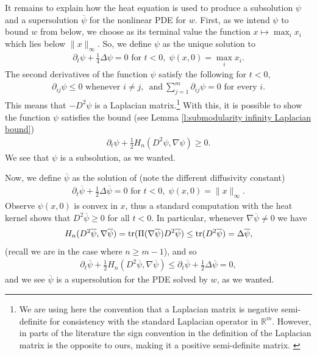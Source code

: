 \documentclass[reqno]{amsart}
\numberwithin{equation}{section}
\DeclareMathOperator{\tr}{\mathrm\mathrm{tr}}
\begin{document}
It remains to explain how the heat equation is used to produce a subsolution $\psi$ and a supersolution $\overline \psi$ for the nonlinear PDE for $w$. First, as we intend $\psi$ to bound $w$ from below, we choose as its terminal value the function  $x\mapsto \max_i x_i$ which lies below $\|x\|_\infty$.  So, we define $\psi$ as the unique solution to
\begin{align*}
  \partial_t \psi + \tfrac{1}{4} \Delta \psi = 0 \text{ for } t<0, \;\psi(x,0) = \max_i x_i.
\end{align*}
The second derivatives of the function $\psi$ satisfy the following for $t<0$,
\begin{align*}
 \partial_{ij}\psi \leq 0 \text{ whenever } i\neq j,\;  ~\text{and}~\sum_{j=1}^m \partial_{ij}\psi = 0 \text{ for every } i.    
\end{align*}
This means that $-D^2\psi$ is a Laplacian  matrix.\footnote{We are using here the convention that a Laplacian matrix is negative semi-definite for consistency with the standard Laplacian operator in $\mathbb{R}^m$. However, in parts of the literature the sign convention in the definition of the Laplacian matrix is the opposite to ours, making it a positive semi-definite matrix. \label{fn:laplacian}} With this, it is possible to show the function $\psi$ satisfies the bound (see Lemma \ref{l:submodularity infinity Laplacian bound})
\begin{align*}
  \partial_t \psi + \tfrac{1}{2}H_n(D^2\psi,\nabla \psi) \geq 0.
\end{align*}
We see that $\psi$ is a subsolution, as we wanted.

Now, we define $\overline \psi$ as the solution of (note the different diffusivity constant)
\begin{align*}
  \partial_t \overline \psi + \tfrac{1}{2}\Delta \overline \psi = 0\text{ for } t<0,\; \psi(x,0) = \|x\|_\infty.    
\end{align*}
Observe $\psi(x,0)$ is convex in $x$, thus a standard computation with the heat kernel shows that $D^2\overline \psi \geq 0$ for all $t<0$. In particular, whenever $\nabla \overline \psi \neq 0$ we have 
\begin{align*}
  H_n(D^2\overline \psi,\nabla \overline \psi) = \tr(\Pi(\nabla \overline \psi)D^2\overline \psi) \leq \tr(D^2\overline \psi) = \Delta \overline \psi,
\end{align*}
(recall we are in the case where $n\geq m-1$), and so
\begin{align*}
  \partial_t \overline \psi+\tfrac{1}{2}H_n(D^2\overline \psi,\nabla \overline \psi) \leq \partial_t \overline \psi + \frac{1}{2}\Delta \overline \psi = 0,
\end{align*}
and we see $\overline \psi$ is a supersolution for the PDE solved by $w$, as we wanted.
\end{document}
